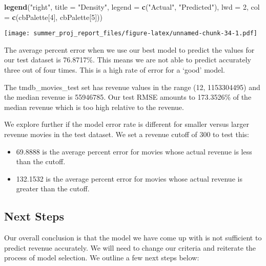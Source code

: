 \documentclass[
]{article}
\newenvironment{Shaded}{\begin{snugshade}}{\end{snugshade}}
\newcommand{\DataTypeTok}[1]{\textcolor[rgb]{0.13,0.29,0.53}{#1}}
\newcommand{\DecValTok}[1]{\textcolor[rgb]{0.00,0.00,0.81}{#1}}
\newcommand{\KeywordTok}[1]{\textcolor[rgb]{0.13,0.29,0.53}{\textbf{#1}}}
\newcommand{\NormalTok}[1]{#1}
\newcommand{\StringTok}[1]{\textcolor[rgb]{0.31,0.60,0.02}{#1}}
\providecommand{\tightlist}{%
  \setlength{\itemsep}{0pt}\setlength{\parskip}{0pt}}
\begin{document}
\begin{Shaded}
\begin{Highlighting}[]
\KeywordTok{legend}\NormalTok{(}\StringTok{"right"}\NormalTok{,}
       \DataTypeTok{title =} \StringTok{"Density"}\NormalTok{,}
       \DataTypeTok{legend =} \KeywordTok{c}\NormalTok{(}\StringTok{"Actual"}\NormalTok{, }\StringTok{"Predicted"}\NormalTok{),}
       \DataTypeTok{lwd =} \DecValTok{2}\NormalTok{,}
       \DataTypeTok{col =} \KeywordTok{c}\NormalTok{(cbPalette[}\DecValTok{4}\NormalTok{], cbPalette[}\DecValTok{5}\NormalTok{]))}
\end{Highlighting}
\end{Shaded}

\texttt{[image: summer\_proj\_report\_files/figure-latex/unnamed-chunk-34-1.pdf]}

The average percent error when we use our best model to predict the
values for our test dataset is 76.8717\%. This means we are not able to
predict accurately three out of four times. This is a high rate of error
for a `good' model.

The tmdb\_movies\_test set has revenue values in the range (12,
1153304495) and the median revenue is 55946785. Our test RMSE amounts to
173.3526\% of the median revenue which is too high relative to the
revenue.

We explore further if the model error rate is different for smaller
versus larger revenue movies in the test dataset. We set a revenue
cutoff of 300 to test this:

\begin{itemize}
\tightlist
\item
  69.8888 is the average percent error for movies whose actual revenue
  is less than the cutoff.
\item
  132.1532 is the average percent error for movies whose actual revenue
  is greater than the cutoff.
\end{itemize}

\hypertarget{next-steps}{%
\subsection{Next Steps}\label{next-steps}}

Our overall conclusion is that the model we have come up with is not
sufficient to predict revenue accurately. We will need to change our
criteria and reiterate the process of model selection. We outline a few
next steps below:
\end{document}
